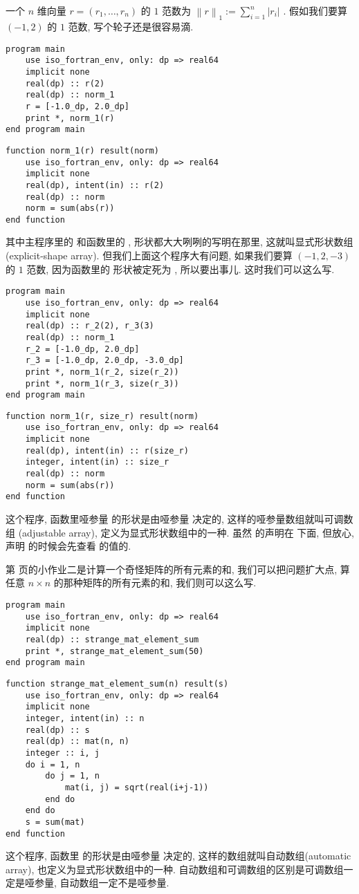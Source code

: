 一个 $ n $ 维向量 $ r=(r_1, \dots, r_n) $ 的 $ 1 $ 范数为 $ \left\lVert r\right\rVert_1:=\sum_{i=1} ^n\left\lvert r_i\right\rvert  $ . 假如我们要算 $(-1, 2) $ 的 $ 1 $ 范数, 写个轮子还是很容易滴. 
\begin{lstlisting} 
program main
    use iso_fortran_env, only: dp => real64
    implicit none
    real(dp) :: r(2)
    real(dp) :: norm_1
    r = [-1.0_dp, 2.0_dp]
    print *, norm_1(r)
end program main
\end{lstlisting}
\begin{lstlisting}
function norm_1(r) result(norm)
    use iso_fortran_env, only: dp => real64
    implicit none
    real(dp), intent(in) :: r(2)
    real(dp) :: norm
    norm = sum(abs(r))
end function
\end{lstlisting} 
其中主程序里的  和函数里的 , 形状都大大咧咧的写明在那里, 这就叫显式形状数组 (explicit-shape array). 但我们上面这个程序大有问题, 如果我们要算 $(-1, 2, -3) $ 的 $ 1 $ 范数, 因为函数里的  形状被定死为 \ttt{[2]}, 所以要出事儿. 这时我们可以这么写. \label{adjustable_array} 
\begin{lstlisting} 
program main
    use iso_fortran_env, only: dp => real64
    implicit none
    real(dp) :: r_2(2), r_3(3)
    real(dp) :: norm_1
    r_2 = [-1.0_dp, 2.0_dp]
    r_3 = [-1.0_dp, 2.0_dp, -3.0_dp]
    print *, norm_1(r_2, size(r_2))
    print *, norm_1(r_3, size(r_3))
end program main
\end{lstlisting}
\begin{lstlisting}
function norm_1(r, size_r) result(norm)
    use iso_fortran_env, only: dp => real64
    implicit none
    real(dp), intent(in) :: r(size_r)
    integer, intent(in) :: size_r
    real(dp) :: norm
    norm = sum(abs(r))
end function
\end{lstlisting} 
这个程序, 函数里哑参量  的形状是由哑参量  决定的, 这样的哑参量数组就叫可调数组 (adjustable array), 定义为显式形状数组中的一种. 虽然  的声明在  下面, 但放心, 声明  的时候会先查看  的值的. 

第 \pageref{hw_2} 页的小作业二是计算一个奇怪矩阵的所有元素的和, 我们可以把问题扩大点, 算任意 $ n\times n $ 的那种矩阵的所有元素的和, 我们则可以这么写. 
\begin{lstlisting} 
program main
    use iso_fortran_env, only: dp => real64
    implicit none
    real(dp) :: strange_mat_element_sum
    print *, strange_mat_element_sum(50)
end program main
\end{lstlisting}
\begin{lstlisting}
function strange_mat_element_sum(n) result(s)
    use iso_fortran_env, only: dp => real64
    implicit none
    integer, intent(in) :: n
    real(dp) :: s
    real(dp) :: mat(n, n)
    integer :: i, j
    do i = 1, n
        do j = 1, n
            mat(i, j) = sqrt(real(i+j-1))
        end do
    end do
    s = sum(mat)
end function
\end{lstlisting} 
这个程序, 函数里  的形状是由哑参量  决定的, 这样的数组就叫自动数组(automatic array), 也定义为显式形状数组中的一种. 自动数组和可调数组的区别是可调数组一定是哑参量, 自动数组一定不是哑参量. 

